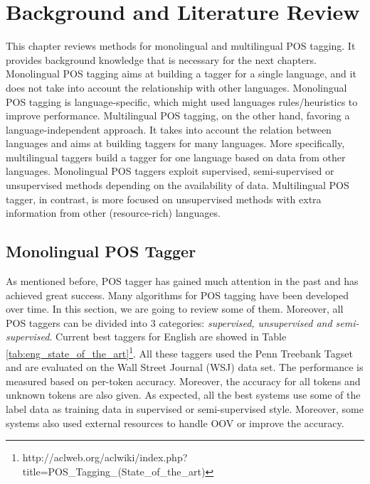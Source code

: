 \chapter{Background and Literature Review}
\label{chap:backGround}
This chapter reviews methods for monolingual and multilingual POS tagging. It provides background knowledge that is necessary for the next chapters. Monolingual POS tagging aims at building a tagger for a single language, and it does not take into account the relationship with other languages. Monolingual POS tagging is language-specific, which might used languages rules/heuristics to improve performance. Multilingual POS tagging, on the other hand, favoring a language-independent approach. It takes into account the relation between languages and aims at building taggers for many languages. More specifically, multilingual taggers build a tagger for one language based on data from other languages. Monolingual POS taggers exploit supervised, semi-supervised or unsupervised methods depending on the availability of data. Multilingual POS tagger, in contrast, is more focused on unsupervised methods with extra information from other (resource-rich) languages.  

\section{Monolingual POS Tagger}
As mentioned before, POS tagger has gained much attention in the past and has achieved great success. Many algorithms for POS tagging have been developed over time. In this section, we are going to review some of them. Moreover, all POS taggers can be divided into 3 categories: \textit{supervised, unsupervised and semi-supervised}. Current best taggers for English are showed in Table \ref{tab:eng_state_of_the_art}\footnote{http://aclweb.org/aclwiki/index.php?title=POS\_Tagging\_(State\_of\_the\_art)}. All these taggers used the Penn Treebank Tagset~\cite{PenTreeBank} and are evaluated on the Wall Street Journal (WSJ) data set. The performance is measured based on per-token accuracy. Moreover, the accuracy for all tokens and unknown tokens are also given. As expected, all the best systems use some of the label data as training data in supervised or semi-supervised style. Moreover, some systems also used external resources to handle OOV or improve the accuracy. 

